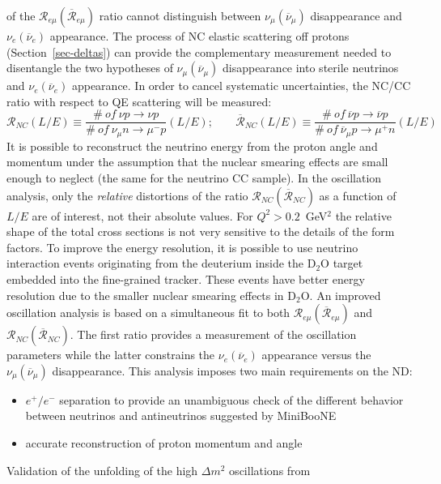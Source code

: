 of the ${\mathcal{R}}_{e \mu} (\overline{\mathcal{R}}_{e \mu})$ ratio cannot distinguish
between $\nu_\mu (\overline{\nu}_\mu)$ disappearance and $\nu_e (\overline{\nu}_e)$ appearance.
The process of NC elastic scattering off protons (Section~\ref{sec-deltas})
can provide the complementary measurement
needed to disentangle the two hypotheses of $\nu_\mu (\overline{\nu}_\mu)$ disappearance into
sterile neutrinos and $\nu_e (\overline{\nu}_e)$ appearance. In order to cancel systematic
uncertainties, the NC/CC ratio with respect to QE scattering will be measured:
\begin{equation}
{\mathcal{R}}_{NC} (L/E)  \equiv  \frac{\#~of~\nu p \to \nu p}{\#~of~\nu_\mu n \to \mu^- p }(L/E); \;\;\;\;\;\;\; \overline{\mathcal{R}}_{NC} (L/E) \equiv \frac{\#~of~\overline{\nu} p \to \overline{\nu} p}{\#~of~\overline{\nu}_\mu p \to \mu^+ n }(L/E)
\end{equation}
It is possible to reconstruct the neutrino energy from the proton
angle and momentum under the assumption that the nuclear smearing
effects are small enough to neglect (the same for the neutrino CC
sample). In the oscillation analysis, only the \emph{relative}
distortions of the ratio ${\mathcal{R}}_{NC}
(\overline{\mathcal{R}}_{NC})$ as a function of $L/E$ are of interest,
not their absolute values. For $Q^2>0.2$~GeV$^2$ the relative shape of
the total cross sections is not very sensitive to the details of the
form factors.  To improve the energy resolution, it is possible to use
neutrino interaction events originating from the deuterium inside the
D$_2$O target embedded into the fine-grained tracker. These events
have better energy resolution due to the smaller nuclear smearing
effects in D$_2$O.
An improved oscillation analysis is based on a simultaneous fit to
both ${\mathcal{R}}_{e \mu} (\overline{\mathcal{R}}_{e \mu})$ and
${\mathcal{R}}_{NC} (\overline{\mathcal{R}}_{NC})$. The first ratio
provides a measurement of the oscillation parameters while the latter
constrains the $\nu_e(\overline{\nu}_e)$ appearance versus the
$\nu_\mu(\overline{\nu}_\mu)$ disappearance. This analysis %
imposes two main requirements %
on the ND:
\begin{itemize}%
\item $e^+/e^-$ separation to provide an unambiguous check of the different
behavior between neutrinos and antineutrinos suggested by MiniBooNE
\item accurate reconstruction of proton momentum and angle
\end{itemize}
Validation of the unfolding of the high $\Delta m^2$ oscillations from
